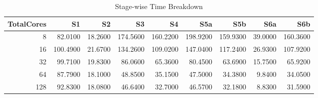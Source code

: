 \begin{table}
\caption{Stage-wise Time Breakdown}
\label{tab:table3_stage_strong_time_table}
\begin{tabular}{rrrrrrrrr}
\toprule
TotalCores & S1 & S2 & S3 & S4 & S5a & S5b & S6a & S6b \\
\midrule
8 & 82.0100 & 18.2600 & 174.5600 & 160.2200 & 198.9200 & 159.9300 & 39.0000 & 160.3600 \\
16 & 100.4900 & 21.6700 & 134.2600 & 109.0200 & 147.0400 & 117.2400 & 26.9300 & 107.9200 \\
32 & 99.7100 & 19.8300 & 86.0600 & 65.3600 & 80.4500 & 63.6900 & 15.7500 & 65.9200 \\
64 & 87.7900 & 18.1000 & 48.8500 & 35.1500 & 47.5000 & 34.3800 & 9.8400 & 34.0500 \\
128 & 92.8300 & 18.0800 & 46.6400 & 32.7000 & 46.5700 & 32.1800 & 8.8300 & 31.5900 \\
\bottomrule
\end{tabular}
\end{table}
